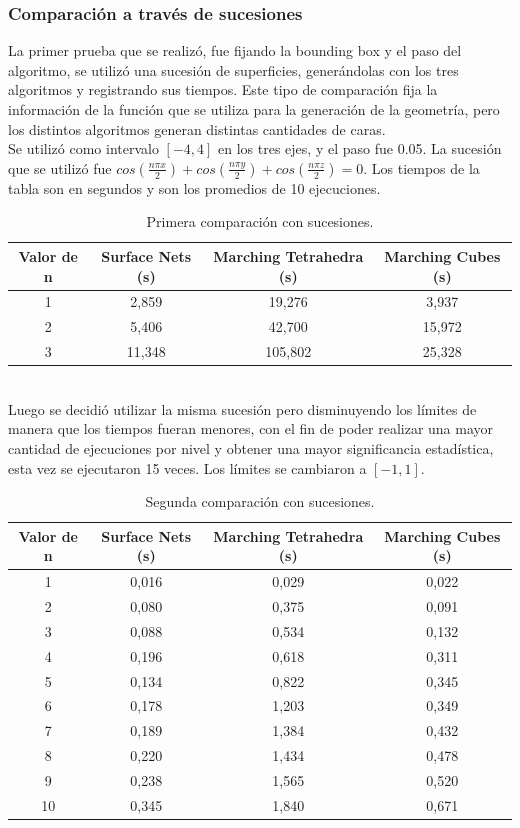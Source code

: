 \documentclass[12pt]{article}
\begin{document}
\subsubsection{Comparación a través de sucesiones}
La primer prueba que se realizó, fue fijando la bounding box y el paso del algoritmo, se utilizó una sucesión de superficies, generándolas con los tres algoritmos y registrando sus tiempos. Este tipo de comparación fija la información de la función que se utiliza para la generación de la geometría, pero los distintos algoritmos generan distintas cantidades de caras.
\\Se utilizó como intervalo $[-4,4]$ en los tres ejes, y el paso fue 0.05. La sucesión que se utilizó fue $cos(\frac{n\pi x}{2}) + cos(\frac{n\pi y}{2}) +cos(\frac{n\pi z}{2}) =0$. Los tiempos de la tabla son en segundos y son los promedios de 10 ejecuciones.
\begin{table}[h!]
  \centering
  \label{tab:table1}
  \begin{tabular}{cccc}
    \toprule
    Valor de n & Surface Nets (s) & Marching Tetrahedra (s) & Marching Cubes (s)\\
    \midrule
    1 & 2,859 & 19,276 & 3,937\\
    2 & 5,406 & 42,700 & 15,972\\
    3 & 11,348 & 105,802 & 25,328\\
    \bottomrule
  \end{tabular}
  \caption{Primera comparación con sucesiones.}
\end{table}
\\Luego se decidió utilizar la misma sucesión pero disminuyendo los límites de manera que los tiempos fueran menores, con el fin de poder realizar una mayor cantidad de ejecuciones por nivel y obtener una mayor significancia estadística, esta vez se ejecutaron 15 veces. Los límites se cambiaron a $[-1,1]$. \\
\begin{table}[h!]
  \centering
  \label{tab:table1}
  \begin{tabular}{cccc}
    \toprule
    Valor de n & Surface Nets (s) & Marching Tetrahedra (s) & Marching Cubes (s)\\
    \midrule
    1 & 0,016 & 0,029 & 0,022\\
    2 & 0,080 & 0,375 & 0,091\\
    3 & 0,088 & 0,534 & 0,132\\
    4 & 0,196 & 0,618 & 0,311\\
    5 & 0,134 & 0,822 & 0,345\\
    6 & 0,178 & 1,203 & 0,349\\
    7 & 0,189 & 1,384 & 0,432\\
    8 & 0,220 & 1,434 & 0,478\\
    9 & 0,238 & 1,565 & 0,520\\
    10 & 0,345 & 1,840 & 0,671\\
    \bottomrule
  \end{tabular}
  \caption{Segunda comparación con sucesiones.}
\end{table}
\end{document}
